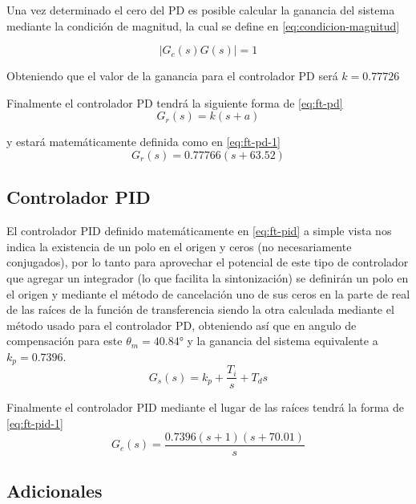 \documentclass[conference]{IEEEtran}
\begin{document}
	Una vez determinado el cero del PD es posible calcular la ganancia del sistema mediante la condición de magnitud, la cual se define en \ref{eq:condicion-magnitud}
	
	\begin{equation}
		|G_c(s)G(s)| = 1
		\label{eq:condicion-magnitud}
	\end{equation}
	
	
	Obteniendo que el valor de la ganancia para el controlador PD será $k=0.77726$
	
	Finalmente el controlador PD tendrá la siguiente forma de \ref{eq:ft-pd}
	\begin{equation}
		G_r(s) = k(s + a)
		\label{eq:ft-pd}
	\end{equation}
	
	y estará matemáticamente definida como en \ref{eq:ft-pd-1}
	\begin{equation}
		G_r(s) = 0.77766(s + 63.52)
		\label{eq:ft-pd-1}
	\end{equation}
	
	\subsection{Controlador PID}
	El controlador PID definido matemáticamente en \ref{eq:ft-pid} a simple vista nos indica la existencia de un polo en el origen y ceros (no necesariamente conjugados), por lo tanto para aprovechar el potencial de este tipo de controlador que agregar un integrador (lo que facilita la sintonización) se definirán un polo en el origen y mediante el método de cancelación uno de sus ceros en la parte de real de las raíces de la función de transferencia siendo la otra calculada mediante el método usado para el controlador PD, obteniendo así que en angulo de compensación para este $\theta_m = 40.84°$ y la ganancia del sistema equivalente a $k_p = 0.7396$.
	\begin{equation}
		G_s(s) = k_p + \frac{T_i}{s} + T_ds
		\label{eq:ft-pid}
	\end{equation}
	
	Finalmente el controlador PID mediante el lugar de las raíces tendrá la forma de \ref{eq:ft-pid-1}
	\begin{equation}
		G_c(s) = \frac{0.7396(s + 1)(s + 70.01)}{s}
		\label{eq:ft-pid-1}
	\end{equation}
	
	\subsection{Adicionales}
	
\end{document}

